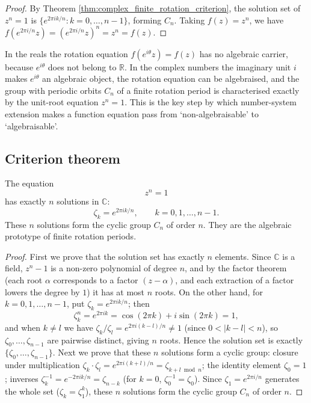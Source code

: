 \begin{proof}
By Theorem \ref{thm:complex_finite_rotation_criterion}, the solution set of $z^n=1$ is $\{e^{2\pi ik/n}:k=0,\dots,n-1\}$, forming $C_n$. Taking $f(z)=z^n$, we have $f(e^{2\pi i/n}z)=(e^{2\pi i/n}z)^n=z^n=f(z)$.
\end{proof}

\begin{remark}\label{rem:complex_makes_rotation_algebraic}
In the reals the rotation equation $f(e^{i\theta}z)=f(z)$ has no algebraic carrier, because $e^{i\theta}$ does not belong to $\mathbb{R}$. In the complex numbers the imaginary unit $i$ makes $e^{i\theta}$ an algebraic object, the rotation equation can be algebraised, and the group with periodic orbits $C_n$ of a finite rotation period is characterised exactly by the unit-root equation $z^n=1$. This is the key step by which number-system extension makes a function equation pass from `non-algebraisable' to `algebraisable'.
\end{remark}
\subsection{\texorpdfstring{Criterion theorem}{Criterion theorem}}

\begin{theorem}\label{thm:complex_finite_rotation_criterion}
The equation
\[
z^n = 1
\]
has exactly $n$ solutions in $\mathbb{C}$:
\[
\zeta_k = e^{2\pi i k/n},\qquad k = 0, 1, \dots, n-1.
\]
These $n$ solutions form the cyclic group $C_n$ of order $n$. They are the algebraic prototype of finite rotation periods.
\end{theorem}

\begin{proof}
First we prove that the solution set has exactly $n$ elements. Since $\mathbb{C}$ is a field, $z^n - 1$ is a non-zero polynomial of degree $n$, and by the factor theorem (each root $\alpha$ corresponds to a factor $(z-\alpha)$, and each extraction of a factor lowers the degree by $1$) it has at most $n$ roots. On the other hand, for $k = 0, 1, \dots, n-1$, put $\zeta_k = e^{2\pi i k/n}$; then
\[
\zeta_k^n = e^{2\pi i k} = \cos(2\pi k) + i\sin(2\pi k) = 1,
\]
and when $k \neq l$ we have $\zeta_k/\zeta_l = e^{2\pi i(k-l)/n} \neq 1$ (since $0 < |k-l| < n$), so $\zeta_0, \dots, \zeta_{n-1}$ are pairwise distinct, giving $n$ roots. Hence the solution set is exactly $\{\zeta_0, \dots, \zeta_{n-1}\}$.
Next we prove that these $n$ solutions form a cyclic group: closure under multiplication $\zeta_k \cdot \zeta_l = e^{2\pi i(k+l)/n} = \zeta_{k+l \bmod n}$; the identity element $\zeta_0 = 1$; inverses $\zeta_k^{-1} = e^{-2\pi i k/n} = \zeta_{n-k}$ (for $k = 0$, $\zeta_0^{-1} = \zeta_0$). Since $\zeta_1 = e^{2\pi i/n}$ generates the whole set ($\zeta_k = \zeta_1^k$), these $n$ solutions form the cyclic group $C_n$ of order $n$.
\end{proof}

